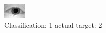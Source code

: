 \begin{figure}[h!]
\begin{center}
\includegraphics[width=0.60\columnwidth]{figures/ID953_class_1_target_2.png}
\end{center}
\caption{ Classification: 1 actual target: 2}
\label{fig:ID953_class_1_target_2}
\end{figure}
